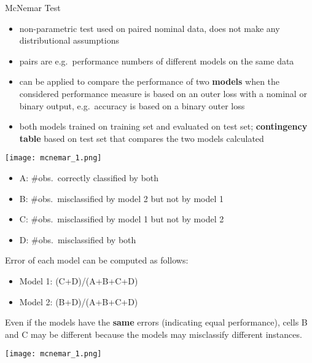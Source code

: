    \begin{frame}[c,allowframebreaks]{McNemar Test}
    \begin{itemize}
    \item non-parametric test used on paired nominal data, does not make any distributional assumptions
    \item pairs are e.g.\ performance numbers of different models on the same data
    \item can be applied to compare the performance of two \textbf{models}
        when the considered performance measure is based on an outer loss with a
        nominal or binary output, e.g.\ accuracy is based on a binary outer loss
    \item both models trained on training set and evaluated on test set;
        \textbf{contingency table} based on test set that compares the two models calculated
    \end{itemize}

    \medskip
    \begin{minipage}{0.25\textwidth}
    \texttt{[image: mcnemar\_1.png]}
    \end{minipage}
    \begin{minipage}{0.74\textwidth}
    \begin{itemize}
    \item A: $\#$obs.\ correctly classified by both
    \item B: $\#$obs.\ misclassified by model 2 but not by model 1
    \item C: $\#$obs.\ misclassified by model 1 but not by model 2
    \item D: $\#$obs.\ misclassified by both
    \end{itemize}
    \end{minipage}

    \framebreak

    \begin{minipage}[c]{0.625\linewidth}
    Error of each model can be computed as follows:
    \begin{itemize}
      \item Model 1: (C+D)/(A+B+C+D)
      \item Model 2: (B+D)/(A+B+C+D)
    \end{itemize}

    Even if the models have the \textbf{same} errors (indicating equal performance), cells B and C may be different because the models may misclassify different instances.
    \end{minipage}
    \begin{minipage}[c]{0.2\linewidth}
        \texttt{[image: mcnemar\_1.png]}
    \end{minipage}


\end{frame}
